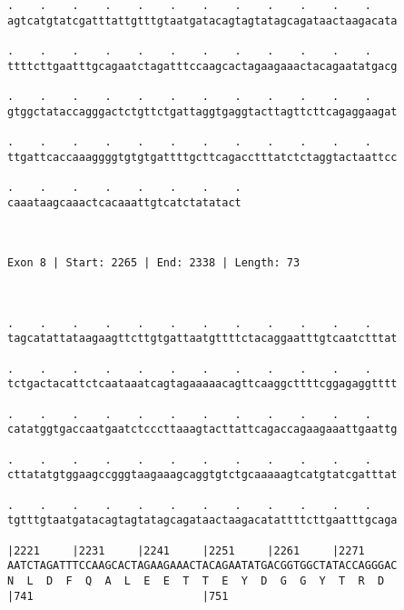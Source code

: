 \documentclass{article}
\begin{document}
\begin{Verbatim}
.    .    .    .    .    .    .    .    .    .    .    .    
agtcatgtatcgatttattgtttgtaatgatacagtagtatagcagataactaagacata
                                                            
.    .    .    .    .    .    .    .    .    .    .    .    
ttttcttgaatttgcagaatctagatttccaagcactagaagaaactacagaatatgacg
                                                            
.    .    .    .    .    .    .    .    .    .    .    .    
gtggctataccagggactctgttctgattaggtgaggtacttagttcttcagaggaagat
                                                            
.    .    .    .    .    .    .    .    .    .    .    .    
ttgattcaccaaaggggtgtgtgattttgcttcagacctttatctctaggtactaattcc
                                                            
.    .    .    .    .    .    .    .
caaataagcaaactcacaaattgtcatctatatact
                                    
                                    
 
Exon 8 | Start: 2265 | End: 2338 | Length: 73



.    .    .    .    .    .    .    .    .    .    .    .    
tagcatattataagaagttcttgtgattaatgttttctacaggaatttgtcaatctttat
                                                            
.    .    .    .    .    .    .    .    .    .    .    .    
tctgactacattctcaataaatcagtagaaaaacagttcaaggcttttcggagaggtttt
                                                            
.    .    .    .    .    .    .    .    .    .    .    .    
catatggtgaccaatgaatctcccttaaagtacttattcagaccagaagaaattgaattg
                                                            
.    .    .    .    .    .    .    .    .    .    .    .    
cttatatgtggaagccgggtaagaaagcaggtgtctgcaaaaagtcatgtatcgatttat
                                                            
.    .    .    .    .    .    .    .    .    .    .    .    
tgtttgtaatgatacagtagtatagcagataactaagacatattttcttgaatttgcaga
                                                            
|2221     |2231     |2241     |2251     |2261     |2271     
AATCTAGATTTCCAAGCACTAGAAGAAACTACAGAATATGACGGTGGCTATACCAGGGAC
N  L  D  F  Q  A  L  E  E  T  T  E  Y  D  G  G  Y  T  R  D  
|741                          |751                          
  

\end{Verbatim}
\end{document}

